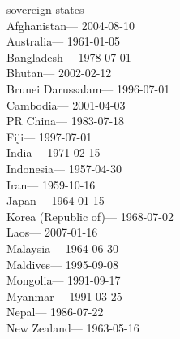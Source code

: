 sovereign states\\
\hspace*{0.333em}Afghanistan--- 2004-08-10\\
\hspace*{0.333em}Australia--- 1961-01-05\\
\hspace*{0.333em}Bangladesh--- 1978-07-01\\
\hspace*{0.333em}Bhutan--- 2002-02-12\\
\hspace*{0.333em}Brunei Darussalam--- 1996-07-01\\
\hspace*{0.333em}Cambodia--- 2001-04-03\\
\hspace*{0.333em}PR China--- 1983-07-18\\
\hspace*{0.333em}Fiji--- 1997-07-01\\
\hspace*{0.333em}India--- 1971-02-15\\
\hspace*{0.333em}Indonesia--- 1957-04-30\\
\hspace*{0.333em}Iran--- 1959-10-16\\
\hspace*{0.333em}Japan--- 1964-01-15\\
\hspace*{0.333em}Korea (Republic of)--- 1968-07-02\\
\hspace*{0.333em}Laos--- 2007-01-16\\
\hspace*{0.333em}Malaysia--- 1964-06-30\\
\hspace*{0.333em}Maldives--- 1995-09-08\\
\hspace*{0.333em}Mongolia--- 1991-09-17\\
\hspace*{0.333em}Myanmar--- 1991-03-25\\
\hspace*{0.333em}\hspace*{0.333em}\hspace*{0.333em}Nepal--- 1986-07-22\\
\hspace*{0.333em}New Zealand--- 1963-05-16\\
